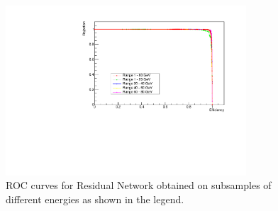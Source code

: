 \begin{figure}
	\centering
	\includegraphics[width=0.8\textwidth]{IMG/Cap6/ROC_Res_sub.pdf}
	\caption{ROC curves for Residual Network obtained on subsamples of different energies as shown in the legend.}
	\label{fig:ROC_Res_sub}
\end{figure}
